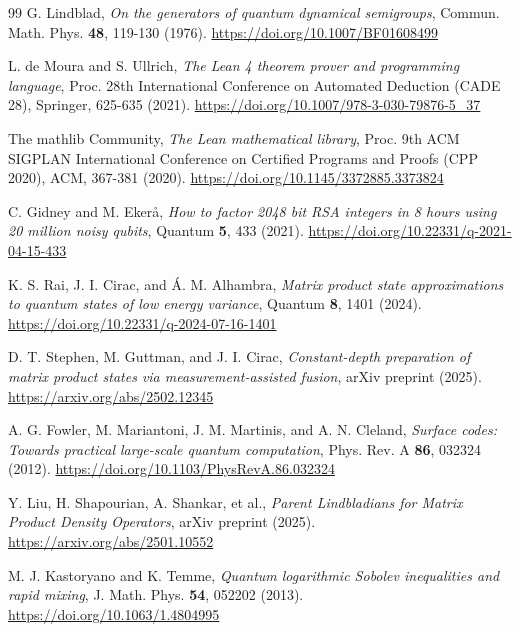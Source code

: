 \documentclass[12pt,a4paper]{article}
\theoremstyle{plain}
\theoremstyle{definition}
\theoremstyle{remark}
\begin{document}
\begin{thebibliography}{99}
G. Lindblad, \textit{On the generators of quantum dynamical semigroups}, Commun. Math. Phys. \textbf{48}, 119-130 (1976). \url{https://doi.org/10.1007/BF01608499}

L. de Moura and S. Ullrich, \textit{The Lean 4 theorem prover and programming language}, Proc. 28th International Conference on Automated Deduction (CADE 28), Springer, 625-635 (2021). \url{https://doi.org/10.1007/978-3-030-79876-5_37}

The mathlib Community, \textit{The Lean mathematical library}, Proc. 9th ACM SIGPLAN International Conference on Certified Programs and Proofs (CPP 2020), ACM, 367-381 (2020). \url{https://doi.org/10.1145/3372885.3373824}

C. Gidney and M. Ekerå, \textit{How to factor 2048 bit RSA integers in 8 hours using 20 million noisy qubits}, Quantum \textbf{5}, 433 (2021). \url{https://doi.org/10.22331/q-2021-04-15-433}

K. S. Rai, J. I. Cirac, and Á. M. Alhambra, \textit{Matrix product state approximations to quantum states of low energy variance}, Quantum \textbf{8}, 1401 (2024). \url{https://doi.org/10.22331/q-2024-07-16-1401}

D. T. Stephen, M. Guttman, and J. I. Cirac, \textit{Constant-depth preparation of matrix product states via measurement-assisted fusion}, arXiv preprint (2025). \url{https://arxiv.org/abs/2502.12345}

A. G. Fowler, M. Mariantoni, J. M. Martinis, and A. N. Cleland, \textit{Surface codes: Towards practical large-scale quantum computation}, Phys. Rev. A \textbf{86}, 032324 (2012). \url{https://doi.org/10.1103/PhysRevA.86.032324}

Y. Liu, H. Shapourian, A. Shankar, et al., \textit{Parent Lindbladians for Matrix Product Density Operators}, arXiv preprint (2025). \url{https://arxiv.org/abs/2501.10552}

M. J. Kastoryano and K. Temme, \textit{Quantum logarithmic Sobolev inequalities and rapid mixing}, J. Math. Phys. \textbf{54}, 052202 (2013). \url{https://doi.org/10.1063/1.4804995}

\end{thebibliography}

\appendix
\end{document}
